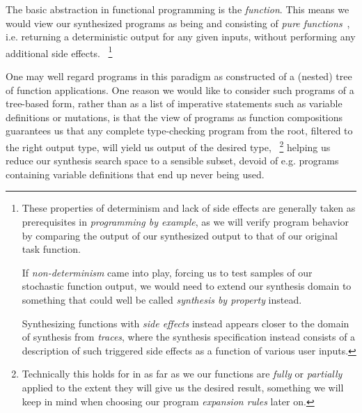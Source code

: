 \documentclass{article}
\begin{document}
The basic abstraction in functional programming is the \emph{function}.
This means we would view our synthesized programs as being and consisting of \emph{pure functions}~\citep{fortran95},
i.e. returning a deterministic output for any given inputs,
without performing any additional side effects.%
~\footnote{
    These properties of determinism and lack of side effects are generally taken as prerequisites in \emph{programming by example},
    as we will verify program behavior by comparing the output of our synthesized output to that of our original task function.

    If \emph{non-determinism} came into play,
    forcing us to test samples of our stochastic function output,
    we would need to extend our synthesis domain to something that could well be called \emph{synthesis by property} instead.

    Synthesizing functions with \emph{side effects} instead appears closer to the domain of synthesis from \emph{traces},
    where the synthesis specification instead consists of a description of such triggered side effects as a function of various user inputs.
}


One may well regard programs in this paradigm as constructed of a (nested) tree of function applications.
One reason we would like to consider such programs of a tree-based form,
rather than as a list of imperative statements such as variable definitions or mutations,
is that the view of programs as function compositions guarantees us that any complete type-checking program from the root,
filtered to the right output type,
will yield us output of the desired type,%
~\footnote{
    Technically this holds for in as far as we our functions are \emph{fully} or \emph{partially} applied to the extent they will give us the desired result,
    something we will keep in mind when choosing our program \emph{expansion rules} later on.
}
helping us reduce our synthesis search space to a sensible subset,
devoid of e.g. programs containing variable definitions that end up never being used.
\end{document}

